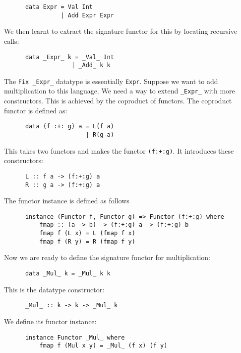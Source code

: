 \documentclass[a4paper,12pt]{article}
\theoremstyle{remark}
\begin{document}
  \begin{lstlisting}
      data Expr = Val Int
                | Add Expr Expr  \end{lstlisting}

  We then learnt to extract the signature functor for this by locating recursive calls:

  \begin{lstlisting}
      data _Expr_ k = _Val_ Int
                   | _Add_ k k  \end{lstlisting}

  The \lstinline{Fix _Expr_} datatype is essentially \lstinline{Expr}. Suppose we want to add multiplication
  to this language. We need a way to extend \lstinline{_Expr_} with more constructors. This is
  achieved by the coproduct of functors. The coproduct functor is defined as:

  \begin{lstlisting}
      data (f :+: g) a = L(f a)
                       | R(g a)  \end{lstlisting}

  This takes two functors and makes the functor \lstinline{(f:+:g)}. It introduces these
  constructors:

  \begin{lstlisting}
      L :: f a -> (f:+:g) a
      R :: g a -> (f:+:g) a  \end{lstlisting}

  The functor instance is defined as follows

  \begin{lstlisting}
      instance (Functor f, Functor g) => Functor (f:+:g) where
          fmap :: (a -> b) -> (f:+:g) a -> (f:+:g) b
          fmap f (L x) = L (fmap f x)
          fmap f (R y) = R (fmap f y)  \end{lstlisting}

  Now we are ready to define the signature functor for multiplication:

  \begin{lstlisting}
      data _Mul_ k = _Mul_ k k  \end{lstlisting}

  This is the datatype constructor:

  \begin{lstlisting}
      _Mul_ :: k -> k -> _Mul_ k  \end{lstlisting}

  We define its functor instance:

  \begin{lstlisting}
      instance Functor _Mul_ where
          fmap f (Mul x y) = _Mul_ (f x) (f y)  \end{lstlisting}
\end{document}
